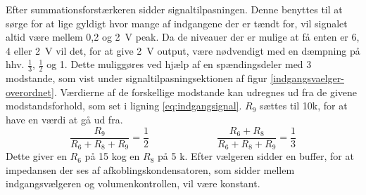 Efter summationsforstærkeren sidder signaltilpasningen. Denne benyttes til at sørge for at lige gyldigt hvor mange af indgangene der er tændt for, vil signalet altid være mellem 0,2 og 2~V peak. Da de niveauer der er mulige at få enten er 6, 4 eller 2~V vil det, for at give 2~V output, være nødvendigt med en dæmpning på hhv. $\frac{1}{3}$, $\frac{1}{2}$ og 1. Dette muliggøres ved hjælp af en spændingsdeler med 3 modstande, som vist under signaltilpasningsektionen af figur \ref{indgangsvaelger-overordnet}. Værdierne af de forskellige modstande kan udregnes ud fra de givene modstandsforhold, som set i ligning \ref{eq:indgangsignal}. $R_9$ sættes til 10k, for at have en værdi at gå ud fra.
\begin{equation}
\label{eq:indgangsignal}
\frac{R_9}{R_6+R_8+R_9}=\frac{1}{2} \;\;\;\;\;\;\;\;\;\;\;\;~~~~~~~~~~~~~~~~
\frac{R_6+R_8}{R_6+R_8+R_9}=\frac{1}{3}
\end{equation}
Dette giver en $R_6$ på 15 k\ohm  og en $R_8$ på 5 k\ohm. Efter vælgeren sidder en buffer, for at impedansen der ses af afkoblingskondensatoren, som sidder mellem indgangsvælgeren og volumenkontrollen, vil være konstant.